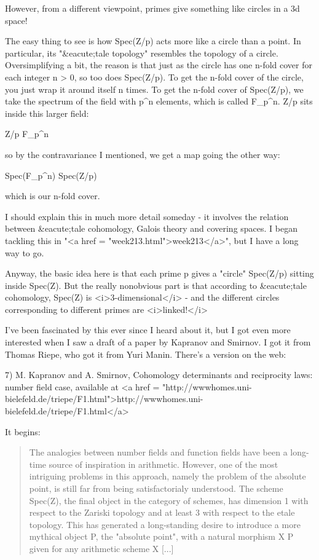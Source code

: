 However, from a different viewpoint, primes give something like
circles in a 3d space!

The easy thing to see is how Spec(Z/p) acts more like a circle than a point.
In particular, its "&eacute;tale topology" resembles the topology of a
circle.  Oversimplifying a bit, the reason is that just as the circle
has one n-fold cover for each integer n > 0, so too does Spec(Z/p).
To get the n-fold cover of the circle, you just wrap it around itself
n times.  To get the n-fold cover of Spec(Z/p), we take the spectrum
of the field with p^{n} elements, which is called
F_{p^{n}}.  Z/p sits inside this larger field:

Z/p \to  F_{p^{n}}

so by the contravariance I mentioned, we get a map going the
other way:

Spec(F_{p^{n}}) \to  Spec(Z/p)

which is our n-fold cover.

I should explain this in much more detail someday - it involves
the relation between &eacute;tale cohomology, Galois theory and
covering spaces.  I began tackling this in 
"<a href = "week213.html">week213</a>", but I have a long
way to go.

Anyway, the basic idea here is that each prime p gives a "circle" 
Spec(Z/p) sitting inside Spec(Z).  
But the really nonobvious part is that according to &eacute;tale
cohomology, Spec(Z) is <i>3-dimensional</i> - and the different circles
corresponding to different primes are <i>linked!</i>

I've been fascinated by this ever since I heard about it, but I
got even more interested when I saw a draft of a paper by 
Kapranov and Smirnov.  I got it from Thomas Riepe, who got
it from Yuri Manin.  There's a version on the web:

7) M. Kapranov and A. Smirnov, Cohomology determinants and
reciprocity laws: number field case, available at
<a href = "http://wwwhomes.uni-bielefeld.de/triepe/F1.html">http://wwwhomes.uni-bielefeld.de/triepe/F1.html</a>

It begins:

\begin{quote}
     The analogies between number fields and function fields
     have been a long-time source of inspiration in arithmetic.
     However, one of the most intriguing problems in this
     approach, namely the problem of the absolute point, is
     still far from being satisfactorialy understood.  The
     scheme Spec(Z), the final object in the category of schemes,
     has dimension 1 with respect to the Zariski topology
     and at least 3 with respect to the etale topology.  This
     has generated a long-standing desire to introduce a more
     mythical object P, the "absolute point", with a natural
     morphism X \to  P given for any arithmetic scheme X [...]
\end{quote}

